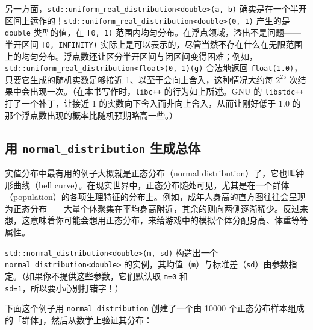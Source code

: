 另一方面，\texttt{std::\allowbreak{}uniform\_\allowbreak{}real\_\allowbreak{}distribution<\allowbreak{}double>\allowbreak{}(\allowbreak{}a,\allowbreak{} b)\allowbreak{}} 确实是在一个半开区间上运作的！\texttt{std::\allowbreak{}uniform\_\allowbreak{}real\_\allowbreak{}distribution<\allowbreak{}double>\allowbreak{}(\allowbreak{}0,\allowbreak{} 1)\allowbreak{}} 产生的是 \texttt{double} 类型的值，在 \texttt{[0,\allowbreak{} 1)\allowbreak{}} 范围内均匀分布。在浮点领域，溢出不是问题——半开区间 \texttt{[0,\allowbreak{} INFINITY)\allowbreak{}} 实际上是可以表示的，尽管当然不存在什么在无限范围上的均匀分布。浮点数还让区分半开区间与闭区间变得困难；例如，\texttt{std::\allowbreak{}uniform\_\allowbreak{}real\_\allowbreak{}distribution<\allowbreak{}float>\allowbreak{}(\allowbreak{}0,\allowbreak{} 1)\allowbreak{}(\allowbreak{}g)\allowbreak{}} 合法地返回 \texttt{float(\allowbreak{}1.0)\allowbreak{}}，只要它生成的随机实数足够接近 1、以至于会向上舍入，这种情况大约每 $2^{25}$ 次结果中会出现一次。（在本书写作时，\texttt{libc++} 的行为如上所述。GNU 的 \texttt{libstdc++} 打了一个补丁，让接近 1 的实数向下舍入而非向上舍入，从而让刚好低于 1.0 的那个浮点数出现的概率比随机预期略高一些。）

\subsection{用 \texttt{normal\_\allowbreak{}distribution} 生成总体}

实值分布中最有用的例子大概就是正态分布（normal distribution）了，它也叫钟形曲线（bell curve）。在现实世界中，正态分布随处可见，尤其是在一个群体（population）的各项生理特征的分布上。例如，成年人身高的直方图往往会呈现为正态分布——大量个体聚集在平均身高附近，其余的则向两侧逐渐稀少。反过来想，这意味着你可能会想用正态分布，来给游戏中的模拟个体分配身高、体重等等属性。

\texttt{std::\allowbreak{}normal\_\allowbreak{}distribution<\allowbreak{}double>\allowbreak{}(\allowbreak{}m,\allowbreak{} sd)\allowbreak{}} 构造出一个 \texttt{normal\_\allowbreak{}distribution<\allowbreak{}double>\allowbreak{}} 的实例，其均值（\texttt{m}）与标准差（\texttt{sd}）由参数指定。（如果你不提供这些参数，它们默认取 \texttt{m=0} 和 \texttt{sd=1}，所以要小心别打错字！）

下面这个例子用 \texttt{normal\_\allowbreak{}distribution} 创建了一个由 10000 个正态分布样本组成的「群体」，然后从数学上验证其分布：

